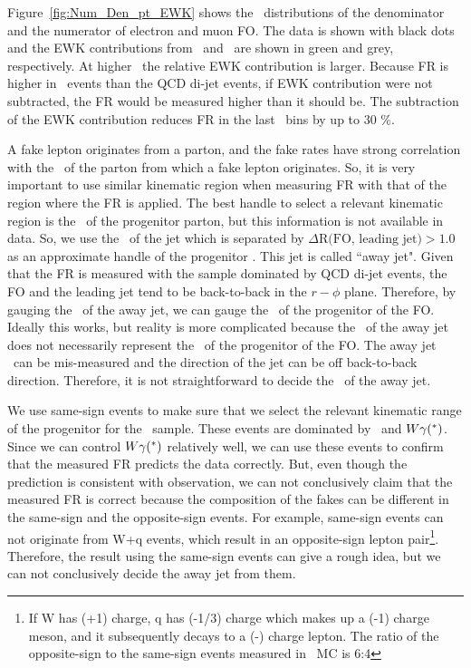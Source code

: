 Figure~\ref{fig:Num_Den_pt_EWK} shows the \pt\ distributions of the denominator and the 
numerator of electron and muon FO. The data is shown with black dots and 
the EWK contributions from \dyll\ and \Wjets\ are shown in green 
and grey, respectively. At higher \pt\ the relative EWK contribution 
is larger. Because FR is higher in \Wjets\ events than the QCD di-jet 
events, if EWK contribution were not subtracted, the FR would be 
measured higher than it should be. The subtraction of the EWK contribution 
reduces FR in the last \pt\ bins by up to 30 \%.

A fake lepton originates from a parton, and the fake rates have strong 
correlation with the \pt\ of the parton from which a fake lepton originates.
So, it is very important to use similar kinematic region when measuring FR 
with that of the region where the FR is applied. The best handle to select 
a relevant kinematic region is the 
\pt\ of the progenitor parton, but this information is not available in data.   
So, we use the \pt\ of the jet which is separated by $\Delta \textrm{R(FO, leading jet)} > 1.0$
as an approximate handle of the progenitor \pt. This jet is called ``away jet".  
Given that the FR is measured with the sample dominated by QCD di-jet events, 
the FO and the leading jet tend to be back-to-back in the $r-\phi$ plane.
Therefore, by gauging the \pt\ of the away jet, we can gauge the \pt\ 
of the progenitor of the FO. Ideally this works, but reality is more 
complicated because the \pt\ of the away jet does not necessarily represent 
the \pt\ of the progenitor of the FO. The away jet \pt\ can be mis-measured 
and the direction of the jet can be off back-to-back direction.  
Therefore, it is not straightforward to decide the \pt\ of the away jet. 

We use same-sign events to make sure that we select the 
relevant kinematic range of the progenitor for the \Wjets\ sample. 
These events are dominated by \Wjets\ and $W\gamma(^*)$. 
Since we can control $W\gamma(^*)$
relatively well, we can use these events to confirm that the measured 
FR predicts the data correctly. 
But, even though the prediction is consistent with observation, 
we can not conclusively claim that the measured FR is correct 
because the composition of the fakes can be different in the same-sign 
and the opposite-sign events. 
For example, same-sign events can not originate from W+q events, 
which result in an opposite-sign lepton pair\footnote{If W has (+1) charge, 
q has (-1/3) charge which makes up a (-1) charge meson, and it subsequently decays 
to a (-) charge lepton. The ratio of the opposite-sign to the same-sign events 
measured in \Wjets\ MC is 6:4}. Therefore, the result using the same-sign events can 
give a rough idea, but we can not conclusively decide the away jet \pt from them. 

